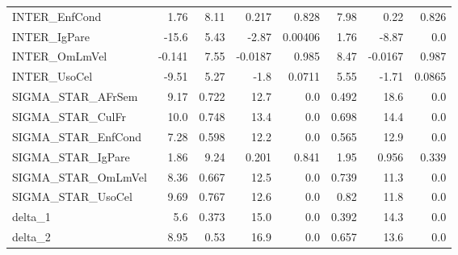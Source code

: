\begin{tabular}{lrrrrrrr}
INTER\_EnfCond      &   1.76 &     8.11 &   0.217 &    0.828 &          7.98 &         0.22 &         0.826 \\
INTER\_IgPare       &  -15.6 &     5.43 &   -2.87 &  0.00406 &          1.76 &        -8.87 &           0.0 \\
INTER\_OmLmVel      & -0.141 &     7.55 & -0.0187 &    0.985 &          8.47 &      -0.0167 &         0.987 \\
INTER\_UsoCel       &  -9.51 &     5.27 &    -1.8 &   0.0711 &          5.55 &        -1.71 &        0.0865 \\
SIGMA\_STAR\_AFrSem  &   9.17 &    0.722 &    12.7 &      0.0 &         0.492 &         18.6 &           0.0 \\
SIGMA\_STAR\_CulFr   &   10.0 &    0.748 &    13.4 &      0.0 &         0.698 &         14.4 &           0.0 \\
SIGMA\_STAR\_EnfCond &   7.28 &    0.598 &    12.2 &      0.0 &         0.565 &         12.9 &           0.0 \\
SIGMA\_STAR\_IgPare  &   1.86 &     9.24 &   0.201 &    0.841 &          1.95 &        0.956 &         0.339 \\
SIGMA\_STAR\_OmLmVel &   8.36 &    0.667 &    12.5 &      0.0 &         0.739 &         11.3 &           0.0 \\
SIGMA\_STAR\_UsoCel  &   9.69 &    0.767 &    12.6 &      0.0 &          0.82 &         11.8 &           0.0 \\
delta\_1            &    5.6 &    0.373 &    15.0 &      0.0 &         0.392 &         14.3 &           0.0 \\
delta\_2            &   8.95 &     0.53 &    16.9 &      0.0 &         0.657 &         13.6 &           0.0 \\
\bottomrule
\end{tabular}

